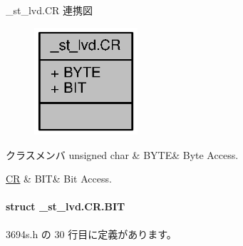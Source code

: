 \+\_\+st\+\_\+lvd.\+C\+R 連携図
\nopagebreak
\begin{figure}[H]
\begin{center}
\leavevmode
\includegraphics[width=109pt]{d8/d82/union__st__lvd_8CR__coll__graph}
\end{center}
\end{figure}
\begin{DoxyFields}{クラスメンバ}
unsigned char\label{3694s_8h_ae409eb2ba6eb6801f52763ae370c350e}
&
B\+Y\+T\+E&
Byte Access. \\
\hline

\hyperlink{3694s_8h_d0/dc2/struct__st__lvd_8CR_8BIT}{C\+R}\label{3694s_8h_adb957fdc8000e1eef04a243f5199aa52}
&
B\+I\+T&
Bit Access. \\
\hline

\end{DoxyFields}
\label{struct__st__lvd_8CR_8BIT}
\paragraph{struct \+\_\+st\+\_\+lvd.\+C\+R.\+B\+I\+T}


 3694s.\+h の 30 行目に定義があります。



